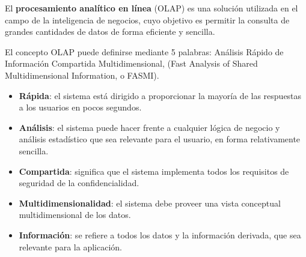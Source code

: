 \documentclass{fancyslides}
\begin{document}
\startingslide %

\begin{frame}
\end{frame}


\begin{frame}
\misc
{
El \textbf{procesamiento analítico en línea} (OLAP) es una solución utilizada en el campo de la inteligencia de negocios, cuyo objetivo es permitir la consulta de grandes cantidades de datos de forma eficiente y sencilla.
}
\end{frame}

\begin{frame}
\misc
{
El concepto OLAP puede definirse mediante 5 palabras: Análisis Rápido de Información Compartida Multidimensional, (Fast Analysis of Shared Multidimensional Information, o FASMI).
}
\end{frame}

\begin{frame}
\misc
{
\begin{itemize}
  \item \textbf{Rápida}: el sistema está dirigido a proporcionar la mayoría de las respuestas a los usuarios en pocos segundos.
  \item \textbf{Análisis}: el sistema puede hacer frente a cualquier lógica de negocio y análisis estadístico que sea relevante para el usuario, en forma relativamente sencilla.
  \item \textbf{Compartida}: significa que el sistema implementa todos los requisitos de seguridad de la confidencialidad.
  \item \textbf{Multidimensionalidad}: el sistema debe proveer una vista conceptual multidimensional de los datos.
  \item \textbf{Información}: se refiere a todos los datos y la información derivada, que sea relevante para la aplicación.
\end{itemize}
}
\end{frame}



\begin{frame}
\end{frame}


\begin{frame}
\end{frame}
\end{document}
